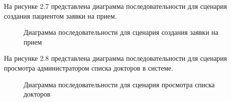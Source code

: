 \clearpage

На рисунке 2.7 представлена диаграмма последовательности для сценария создания пациентом заявки на прием.

\begin{figure}[!h]
	\caption{Диаграмма последовательности для сценария создания заявки на прием}
\end{figure}

На рисунке 2.8 представлена диаграмма последовательности для сценария просмотра администратором списка докторов в системе.

\begin{figure}[!h]
	\caption{Диаграмма последовательности для сценария просмотра списка докторов}
\end{figure}

\clearpage

